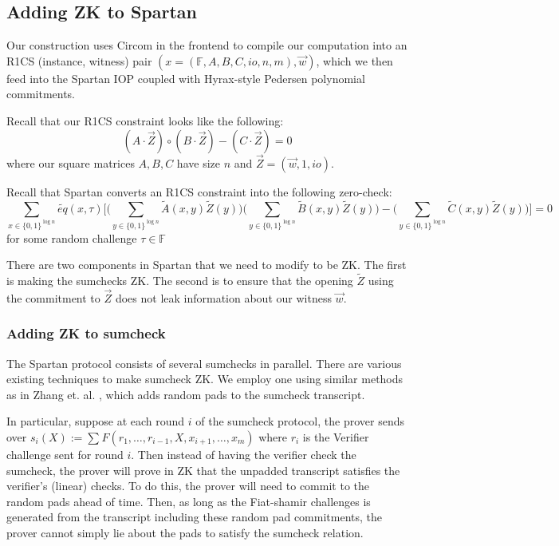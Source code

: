 \subsection{Adding ZK to Spartan}

Our construction uses Circom in the frontend to compile our computation into an R1CS (instance, witness) pair $(x=(\mathbb{F}, A, B, C, io, n, m), \vec{w})$, 
which we then feed into the Spartan IOP coupled with Hyrax-style Pedersen polynomial commitments.

Recall that our R1CS constraint looks like the following:
$$
(A \cdot \vec{Z}) \circ (B \cdot \vec{Z}) - (C \cdot \vec{Z}) = 0
$$
where our square matrices $A, B, C$ have size $n$ and $\vec{Z} = (\vec{w}, 1, io)$.

Recall that Spartan converts an R1CS constraint into the following zero-check:
$$
\sum_{x \in \{0,1\}^{\log n}} \widetilde{eq}(x, \tau) 
\bigg[\bigg(\sum_{y \in \{0,1\}^{\log n}} \widetilde{A}(x,y) \widetilde{Z}(y)\bigg)
\bigg(\sum_{y \in \{0,1\}^{\log n}} \widetilde{B}(x,y) \widetilde{Z}(y)\bigg)
- \bigg(\sum_{y \in \{0,1\}^{\log n}} \widetilde{C}(x,y) \widetilde{Z}(y)\bigg)\bigg] = 0
$$
for some random challenge $\tau \in \mathbb{F}$

There are two components in Spartan that we need to modify to be ZK. 
The first is making the sumchecks ZK. 
The second is to ensure that the opening $\widetilde{Z}$ using the commitment to $\vec{Z}$ does not leak information about our witness $\vec{w}$.

\subsubsection{Adding ZK to sumcheck}

The Spartan protocol consists of several sumchecks in parallel. There are various existing techniques to make sumcheck ZK. 
We employ one using similar methods as in Zhang et. al. \cite{cryptoeprint:2019/1482}, which adds random pads to the sumcheck transcript.

In particular, suppose at each round $i$ of the sumcheck protocol, the prover sends over $s_i(X) := \sum_{} F(r_1, \dots, r_{i-1}, X, x_{i+1}, \dots, x_m)$ 
where $r_i$ is the Verifier challenge sent for round $i$. Then instead of having the verifier check the sumcheck, the prover will prove in ZK that the unpadded transcript satisfies the verifier's (linear) checks.
To do this, the prover will need to commit to the random pads ahead of time. 
Then, as long as the Fiat-shamir challenges is generated from the transcript including these random pad commitments, the prover cannot simply lie about the pads to satisfy the sumcheck relation.

